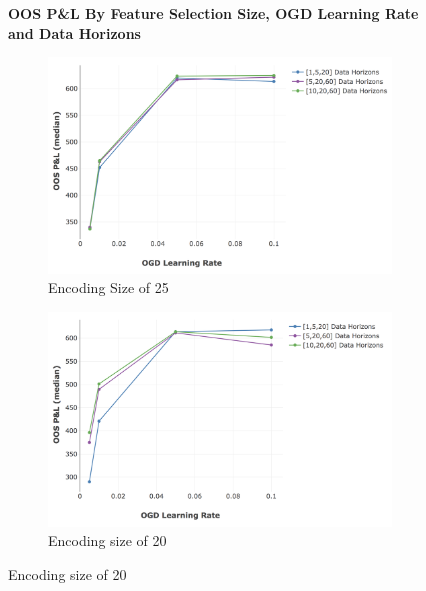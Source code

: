 \documentclass[a4paper,11pt,oneside]{article}
\theoremstyle{plain}
\theoremstyle{definition}
\begin{document}
		\newpage
		\begin{figure}[H]
			\centering
			\textbf{OOS P\&L By Feature Selection Size, OGD Learning Rate and Data Horizons}
			\begin{subfigure}{0.425\linewidth}
				\centering\includegraphics[scale=0.3]{images/results/primary/OOS_OGDLR_Delta_Encoding_25_median.png}
				\caption{Encoding Size of 25}
			\end{subfigure}
			\begin{subfigure}{0.49\linewidth}
				\centering\includegraphics[scale=0.3]{images/results/primary/OOS_OGDLR_Delta_Encoding_20_median.png}
				\caption{Encoding size of 20}
			\end{subfigure}%
			

\end{figure}
\end{document}
